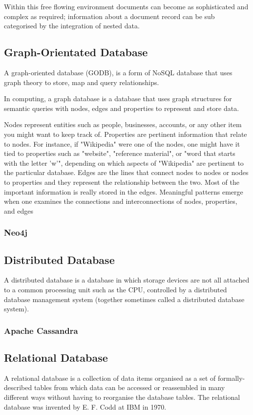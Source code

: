 Within this free flowing environment documents can become as sophisticated and complex as required; information about a document record can be sub categorised by the integration of nested data.

\subsection{Graph-Orientated Database}
A graph-oriented database (GODB), is a form of NoSQL database that uses graph theory to store, map and query relationships. 

In computing, a graph database is a database that uses graph structures for semantic queries with nodes, edges and properties to represent and store data.

Nodes represent entities such as people, businesses, accounts, or any other item you might want to keep track of. Properties are pertinent information that relate to nodes. For instance, if "Wikipedia" were one of the nodes, one might have it tied to properties such as "website", "reference material", or "word that starts with the letter 'w'", depending on which aspects of "Wikipedia" are pertinent to the particular database. Edges are the lines that connect nodes to nodes or nodes to properties and they represent the relationship between the two. Most of the important information is really stored in the edges. Meaningful patterns emerge when one examines the connections and interconnections of nodes, properties, and edges

\subsubsection{Neo4j}\label{neo}

\subsection{Distributed Database}
A distributed database is a database in which storage devices are not all attached to a common processing unit such as the CPU, controlled by a distributed database management system (together sometimes called a distributed database system).

\subsubsection{Apache Cassandra}\label{cassandra}

\subsection{Relational Database}
A relational database is a collection of data items organised as a set of formally-described tables from which data can be accessed or reassembled in many different ways without having to reorganise the database tables. The relational database was invented by E. F. Codd at IBM in 1970.

